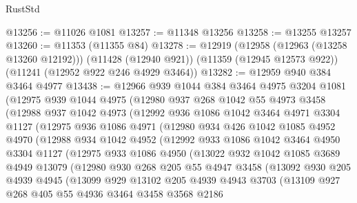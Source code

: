 \begin{lexlean}{RustStd}
\begin{coremodule}
{{{{{{{{{{{{{{{{{{{@13256 := @11026 @1081
@13257 := @11348 @13256
@13258 := @13255 @13257
@13260 := @11353 (@11355 @84)
@13278 := @12919
    (@12958 (@12963 (@13258 @13260 @12192)))
    (@11428 (@12940 @921))
    (@11359 (@12945 @12573 @922))
    (@11241 (@12952 @922 @246 @4929 @3464))
@13282 := @12959 @940 @384 @3464 @4977
@13438 := @12966
    @939
    @1044
    @384
    @3464
    @4975
    @3204
    @1081
    (@12975
      @939
      @1044
      @4975
      (@12980
        @937
        @268
        @1042
        @55
        @4973
        @3458
        (@12988
          @937
          @1042
          @4973
          (@12992
            @936
            @1086
            @1042
            @3464
            @4971
            @3304
            @1127
            (@12975
              @936
              @1086
              @4971
              (@12980
                @934
                @426
                @1042
                @1085
                @4952
                @4970
                (@12988
                  @934
                  @1042
                  @4952
                  (@12992
                    @933
                    @1086
                    @1042
                    @3464
                    @4950
                    @3304
                    @1127
                    (@12975
                      @933
                      @1086
                      @4950
                      (@13022
                        @932
                        @1042
                        @1085
                        @3689
                        @4949
                        @13079
                        (@12980
                          @930
                          @268
                          @205
                          @55
                          @4947
                          @3458
                          (@13092
                            @930
                            @205
                            @4939
                            @4945
                            (@13099
                              @929
                              @13102
                              @205
                              @4939
                              @4943
                              @3703
                              (@13109
                                @927
                                @268
                                @405
                                @55
                                @4936
                                @3464
                                @3458
                                @3568
                                @2186
}}}}}}}}}}}}}}}}}}}
\end{coremodule}
\end{lexlean}

